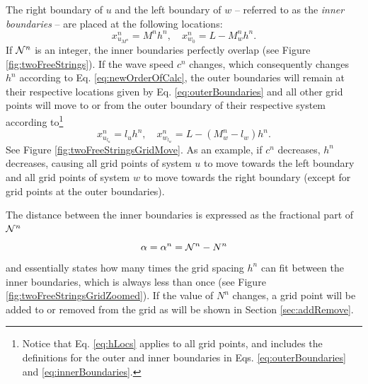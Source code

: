 The right boundary of $u$ and the left boundary of $w$ -- referred to as the \textit{inner boundaries} -- are placed at the following locations:
\begin{equation}\label{eq:innerBoundaries}
    x_{u_{M^n}}^n = M^nh^n, \quad x_{w_{0}}^n = L-M_w^nh^n.
\end{equation}
If $\mathcal{N}^n$ is an integer, the inner boundaries perfectly overlap (see Figure \ref{fig:twoFreeStrings}). If the wave speed $c^n$ changes, which consequently changes $h^n$ according to Eq. \eqref{eq:newOrderOfCalc}, the outer boundaries will remain at their respective locations given by Eq. \eqref{eq:outerBoundaries} and all other grid points will move to or from the outer boundary of their respective system according to\footnote{Notice that Eq. \eqref{eq:hLocs} applies to all grid points, and includes the definitions for the outer and inner boundaries in Eqs. \eqref{eq:outerBoundaries} and \eqref{eq:innerBoundaries}.} 
\begin{equation}\label{eq:hLocs}
    x_{u_{l_u}}^n =l_uh^n, \quad x_{w_{l_w}}^n = L-(M_w^n-l_w)h^n.
\end{equation}
See Figure \ref{fig:twoFreeStringsGridMove}. As an example, if $c^n$ decreases, $h^n$ decreases, causing all grid points of system $u$ to move towards the left boundary and all grid points of system $w$ to move towards the right boundary (except for grid points at the outer boundaries).

The distance between the inner boundaries is expressed as the fractional part of $\mathcal{N}^n$
\begin{equation}\label{eq:alphaDef}
    \alpha = \alpha^n = \mathcal{N}^n - N^n
\end{equation}
and essentially states how many times the grid spacing $h^n$ can fit between the inner boundaries, which is always less than once (see Figure \ref{fig:twoFreeStringsGridZoomed}). If the value of $N^n$ changes, a grid point will be added to or removed from the grid as will be shown in Section \ref{sec:addRemove}.

